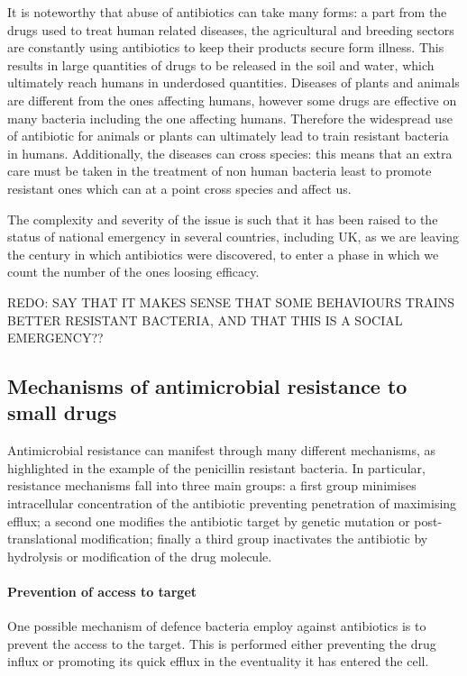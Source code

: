 \documentclass[a4paper,11pt]{extreport}
\begin{document}
It is noteworthy that abuse of antibiotics can take many forms: a part from the drugs used to treat human related diseases, the agricultural and breeding sectors are constantly using antibiotics to keep their products secure form illness. This results in large quantities of drugs to be released in the soil and water, which ultimately reach humans in underdosed quantities. Diseases of plants and animals are different from the ones affecting humans, however some drugs are effective on many bacteria including the one affecting humans. Therefore the widespread use of antibiotic for animals or plants can ultimately lead to train resistant bacteria in humans.\cite{????}
%
Additionally, the diseases can cross species: this means that an extra care must be taken in the treatment of non human bacteria least to promote resistant ones which can at a point cross species and affect us.\cite{????}

The complexity and severity of the issue is such that it has been raised to the status of national emergency in several countries, including UK, as we are leaving the century in which antibiotics were discovered, to enter a phase in which we count the number of the ones loosing efficacy.\cite{Oneill2016}

REDO: SAY THAT IT MAKES SENSE THAT SOME BEHAVIOURS TRAINS BETTER RESISTANT BACTERIA, AND THAT THIS IS A SOCIAL EMERGENCY??


\subsection{Mechanisms of antimicrobial resistance to small drugs} \label{sec:AMR_mechs}

Antimicrobial resistance can manifest through many different mechanisms, as highlighted in the example of the penicillin resistant bacteria.
%
In particular, resistance mechanisms fall into three main groups: a first group minimises intracellular concentration of the antibiotic preventing penetration of maximising efflux; a second one modifies the antibiotic target by genetic mutation or post-translational modification; finally a third group inactivates the antibiotic by hydrolysis or modification of the drug molecule.\cite{Blair2014}

\paragraph{Prevention of access to target}
One possible mechanism of defence bacteria employ against antibiotics is to prevent the access to the target. This is performed either preventing the drug influx or promoting its quick efflux in the eventuality it has entered the cell.
\end{document}
